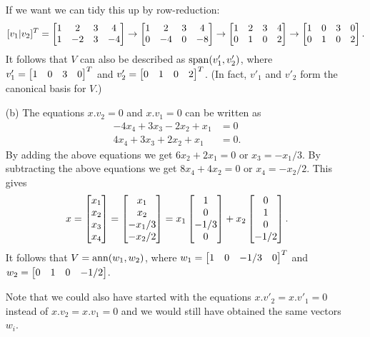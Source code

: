 \documentclass[a4paper]{amsart}
\renewenvironment{solution}{\SolutionInline}{\endSolutionInline}
\begin{document}
\begin{solution}
\begin{itemize}
   If we want we can tidy this up by row-reduction:
   \[ [v_1|v_2]^T = 
      \left[\begin{matrix} 1 & 2 & 3 & 4 \\ 1 & -2 & 3 & -4 \end{matrix}\right] \to
      \left[\begin{matrix} 1 & 2 & 3 & 4 \\ 0 & -4 & 0 & -8 \end{matrix}\right] \to
      \left[\begin{matrix} 1 & 2 & 3 & 4 \\ 0 &  1 & 0 &  2 \end{matrix}\right] \to
      \left[\begin{matrix} 1 & 0 & 3 & 0 \\ 0 &  1 & 0 &  2 \end{matrix}\right].
   \]
   It follows that $V$ can also be described as $\operatorname{span}(v'_1,v'_2)$,
   where $v'_1=\left[\begin{matrix} 1&0&3&0\end{matrix}\right]^T$ and $v'_2=\left[\begin{matrix} 0&1&0&2\end{matrix}\right]^T$.
   (In fact, $v'_1$ and $v'_2$ form the canonical basis for $V$.)
  \item[(b)] The equations $x.v_2=0$ and $x.v_1=0$ can be written as 
   \begin{align*}
    -4x_4+3x_3-2x_2+x_1 &= 0 \\
     4x_4+3x_3+2x_2+x_1 &= 0.
   \end{align*}
   By adding the above equations we get $6x_2+2x_1=0$ or
   $x_3=-x_1/3$.  By subtracting the above equations we get
   $8x_4+4x_2=0$ or $x_4=-x_2/2$.  This gives
   \[ x = \left[\begin{matrix} x_1\\x_2\\x_3\\x_4\end{matrix}\right] 
        = \left[\begin{matrix} x_1\\x_2\\-x_1/3\\-x_2/2\end{matrix}\right] 
        = x_1 \left[\begin{matrix} 1\\0\\-1/3\\0\end{matrix}\right] + 
          x_2 \left[\begin{matrix} 0\\1\\0\\-1/2\end{matrix}\right].
   \]
   It follows that $V=\operatorname{ann}(w_1,w_2)$, where
   $w_1=\left[\begin{matrix} 1&0&-1/3&0\end{matrix}\right]^T$ and $w_2=\left[\begin{matrix} 0&1&0&-1/2\end{matrix}\right]$.

   Note that we could also have started with the equations
   $x.v'_2=x.v'_1=0$ instead of $x.v_2=x.v_1=0$ and we would still
   have obtained the same vectors $w_i$.
 \end{itemize}
\end{solution}
\end{document}
